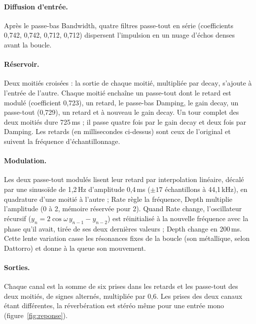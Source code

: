 \documentclass[a4paper,11pt]{article}
\begin{document}
\paragraph{Diffusion d'entrée.} Après le passe-bas Bandwidth, quatre filtres passe-tout en
série (coefficients 0,742, 0,742, 0,712, 0,712) dispersent l'impulsion en un nuage d'échos
denses avant la boucle.

\paragraph{Réservoir.} Deux moitiés croisées : la sortie de chaque moitié, multipliée par
$\mathrm{decay}$, s'ajoute à l'entrée de l'autre. Chaque moitié enchaîne un passe-tout dont le
retard est modulé (coefficient 0,723), un retard, le passe-bas Damping, le gain decay, un
passe-tout (0,729), un retard et à nouveau le gain decay. Un tour complet des deux moitiés dure
725\,ms ; il passe quatre fois par le gain decay et deux fois par Damping. Les retards (en
millisecondes ci-dessus) sont ceux de l'original et suivent la fréquence d'échantillonnage.

\paragraph{Modulation.} Les deux passe-tout modulés lisent leur retard par interpolation
linéaire, décalé par une sinusoïde de 1,2\,Hz d'amplitude 0,4\,ms ($\pm 17$ échantillons à
44,1\,kHz), en quadrature d'une moitié à l'autre ; Rate règle la fréquence, Depth multiplie
l'amplitude (0 à 2, mémoire réservée pour 2). Quand Rate change, l'oscillateur récursif
($y_n = 2\cos\omega\, y_{n-1} - y_{n-2}$) est réinitialisé à la nouvelle fréquence avec la
phase qu'il avait, tirée de ses deux dernières valeurs ; Depth change en 200\,ms. Cette lente variation casse les résonances
fixes de la boucle (son métallique, selon Dattorro) et donne à la queue son mouvement.

\paragraph{Sorties.} Chaque canal est la somme de six prises dans les retards et les passe-tout
des deux moitiés, de signes alternés, multipliée par 0,6. Les prises des deux canaux étant
différentes, la réverbération est stéréo même pour une entrée mono (figure~\ref{fig:reponse}).
\end{document}
